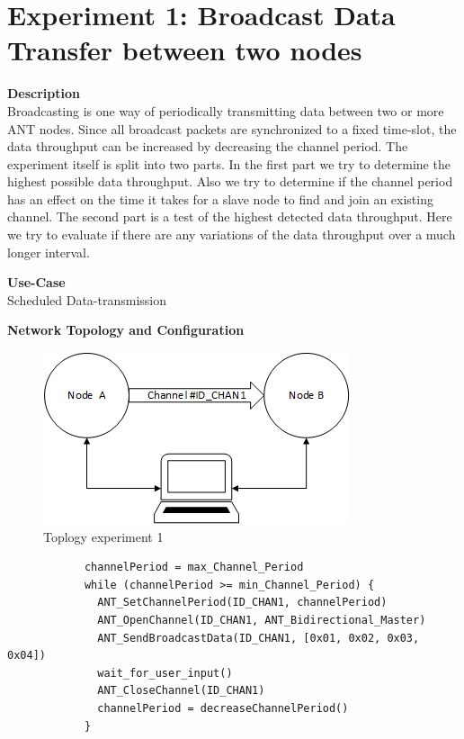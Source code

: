 \section{Experiment 1: Broadcast Data Transfer between two nodes}
\begin{description} 
	\item{\textbf{Description}} \hfill \\ Broadcasting is one way of periodically transmitting data between two or more ANT nodes. Since all broadcast packets are synchronized to a fixed time-slot, the data throughput can be increased by decreasing the channel period. The experiment itself is split into two parts. In the first part we try to determine the highest possible data throughput. Also we try to determine if the channel period has an effect on the time it takes for a slave node to find and join an existing channel. The second part is a test of the highest detected data throughput. Here we try to evaluate if there are any variations of the data throughput over a much longer interval.	
	\item{\textbf{Use-Case}} \hfill \\ Scheduled Data-transmission	
	\item{\textbf{Network Topology and Configuration}} \hfill \\ 
	\begin{figure}[H]
		\centering
		\includegraphics[scale=1]{./pics/exp_topo.png}
		\caption{Toplogy experiment 1}
	\end{figure}
		\begin{code}[H]
			\begin{verbatim}
			channelPeriod = max_Channel_Period
			while (channelPeriod >= min_Channel_Period) {
			  ANT_SetChannelPeriod(ID_CHAN1, channelPeriod)
			  ANT_OpenChannel(ID_CHAN1, ANT_Bidirectional_Master)
			  ANT_SendBroadcastData(ID_CHAN1, [0x01, 0x02, 0x03, 0x04])
			  wait_for_user_input()
			  ANT_CloseChannel(ID_CHAN1)
			  channelPeriod = decreaseChannelPeriod()
			}
			\end{verbatim}
			\caption{Broadcast data single channel (Master)}\label{lst:mExp1}
		\end{code}
		

\end{description}
